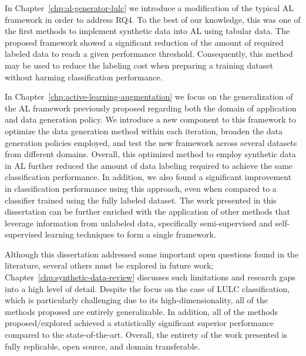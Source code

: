 In Chapter~\ref{chp:al-generator-lulc} we introduce a modification of the
typical AL framework in order to address RQ4. To the best of our knowledge,
this was one of the first methods to implement synthetic data into AL using
tabular data. The proposed framework showed a significant reduction of the
amount of required labeled data to reach a given performance threshold.
Consequently, this method may be used to reduce the labeling cost when
preparing a training dataset without harming classification performance\@.

In Chapter~\ref{chp:active-learning-augmentation} we focus on the
generalization of the AL framework previously proposed regarding both the
domain of application and data generation policy. We introduce a new component
to this framework to optimize the data generation method within each
iteration, broaden the data generation policies employed, and test the new
framework across several datasets from different domains. Overall, this
optimized method to employ synthetic data in AL further reduced the amount of
data labeling required to achieve the same classification performance. In
addition, we also found a significant improvement in classification
performance using this approach, even when compared to a classifier trained
using the fully labeled dataset. The work presented in this dissertation can
be further enriched with the application of other methods that leverage
information from unlabeled data, specifically semi-supervised and
self-supervised learning techniques to form a single framework.

Although this dissertation addressed some important open questions found in
the literature, several others must be explored in future work;
Chapter~\ref{chp:synthetic-data-review} discusses such limitations and
research gaps into a high level of detail. Despite the focus on the case of
LULC classification, which is particularly challenging due to its
high-dimensionality, all of the methods proposed are entirely generalizable.
In addition, all of the methods proposed/explored achieved a statistically
significant superior performance compared to the state-of-the-art. Overall,
the entirety of the work presented is fully replicable, open source, and
domain transferable. 
